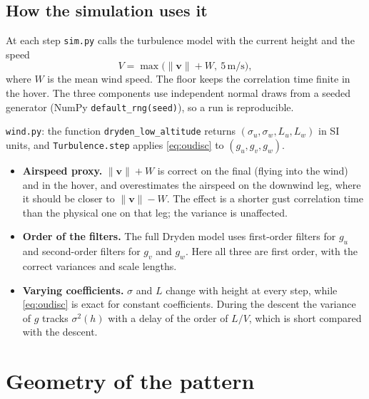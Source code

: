 \documentclass[11pt,a4paper]{article}
\newcommand{\code}[1]{\texttt{#1}}
\newcommand{\un}[1]{\,\mathrm{#1}}
\begin{document}
\subsection{How the simulation uses it}

At each step \code{sim.py} calls the turbulence model with the current height
and the speed
\begin{equation}
V = \max\bigl(\lVert\mathbf{v}\rVert + W,\ 5\un{m/s}\bigr),
\end{equation}
where $W$ is the mean wind speed. The floor keeps the correlation time finite
in the hover. The three components use independent normal draws from a seeded
generator (NumPy \code{default\_rng(seed)}), so a run is reproducible.

\begin{codemap}
\code{wind.py}: the function \code{dryden\_low\_altitude} returns
$(\sigma_u,\sigma_w,L_u,L_w)$ in SI units, and \code{Turbulence.step} applies
\eqref{eq:oudisc} to $(g_u,g_v,g_w)$.
\end{codemap}

\begin{devnote}
\begin{itemize}[leftmargin=1.2em]
\item \textbf{Airspeed proxy.} $\lVert\mathbf v\rVert+W$ is correct on the
final (flying into the wind) and in the hover, and overestimates the airspeed
on the downwind leg, where it should be closer to $\lVert\mathbf v\rVert-W$.
The effect is a shorter gust correlation time than the physical one on that
leg; the variance is unaffected.
\item \textbf{Order of the filters.} The full Dryden model uses first-order
filters for $g_u$ and second-order filters for $g_v$ and $g_w$. Here all
three are first order, with the correct variances and scale lengths.
\item \textbf{Varying coefficients.} $\sigma$ and $L$ change with height at
every step, while \eqref{eq:oudisc} is exact for constant coefficients. During
the descent the variance of $g$ tracks $\sigma^2(h)$ with a delay of the order
of $L/V$, which is short compared with the descent.
\end{itemize}
\end{devnote}

\section{Geometry of the pattern}\label{sec:geometry}
\end{document}
